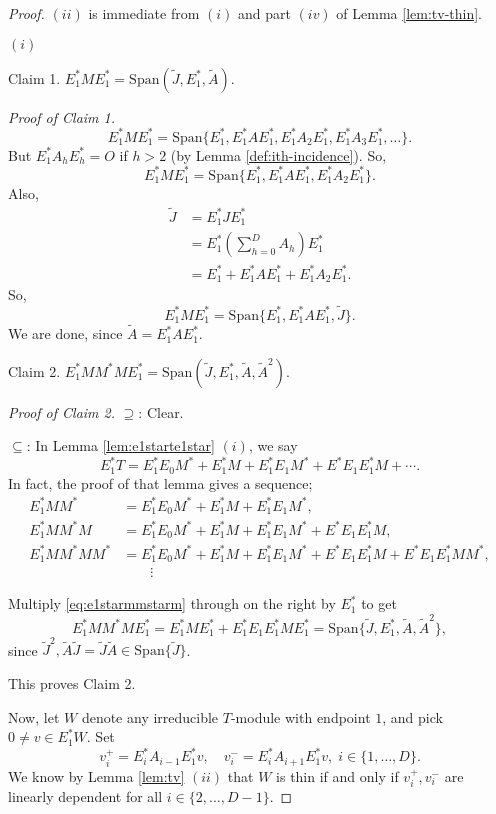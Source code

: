 \documentclass[
]{book}
\theoremstyle{definition}
\theoremstyle{definition}
\theoremstyle{definition}
\theoremstyle{definition}
\theoremstyle{remark}
\begin{document}
\begin{proof}
\leavevmode

\((ii)\) is immediate from \((i)\) and part \((iv)\) of Lemma \ref{lem:tv-thin}.

\((i)\)

Claim 1. \(E^*_1ME^*_1 = \mathrm{Span}(\tilde{J}, E^*_1, \tilde{A})\).

\emph{Proof of Claim 1.}
\[E^*_1ME^*_1 = \mathrm{Span}\{E^*_1, E^*_1AE^*_1, E^*_1A_2E^*_1, E^*_1A_3E^*_1, \ldots\}.\]
But \(E^*_1A_hE^*_h = O\) if \(h >2\) (by Lemma \ref{def:ith-incidence}).
So,
\[E^*_1ME^*_1 = \mathrm{Span}\{E^*_1, E^*_1AE^*_1, E^*_1A_2E^*_1\}.\]
Also,
\begin{align}
\tilde{J} & = E^*_1JE^*_1 \\
& = E^*_1\left(\sum_{h=0}^DA_h\right)E^*_1\\
& = E^*_1 + E^*_1AE^*_1 + E^*_1A_2E^*_1.
\end{align}
So,
\[E^*_1ME^*_1 = \mathrm{Span}\{E^*_1, E^*_1AE^*_1, \tilde{J}\}.\]
We are done, since \(\tilde{A} = E^*_1AE^*_1\).

Claim 2. \(E^*_1MM^*ME^*_1 = \mathrm{Span}(\tilde{J}, E^*_1, \tilde{A}, \tilde{A}^2)\).

\emph{Proof of Claim 2.}
\(\supseteq\): Clear.

\(\subseteq\): In Lemma \ref{lem:e1starte1star} \((i)\), we say
\[E^*_1T = E^*_1E_0M^* + E^*_1M + E^*_1E_1M^* + E^*E_1E^*_1M + \cdots.\]
In fact, the proof of that lemma gives a sequence;
\begin{align}
E^*_1MM^* & = E^*_1E_0M^* + E^*_1M + E^*_1E_1M^*,\\
E^*_1MM^*M & = E^*_1E_0M^* + E^*_1M + E^*_1E_1M^* + E^*E_1E^*_1M, \label{eq:e1starmmstarm}\\
E^*_1MM^*MM^* & = E^*_1E_0M^* + E^*_1M + E^*_1E_1M^* + E^*E_1E^*_1M + E^*E_1E^*_1MM^*,\\
& \qquad \vdots
\end{align}

Multiply \eqref{eq:e1starmmstarm} through on the right by \(E^*_1\) to get
\[E^*_1MM^*ME^*_1 = E^*_1ME^*_1 + E^*_1E_1E^*_1ME^*_1 = \mathrm{Span}\{\tilde{J}, E^*_1, \tilde{A}, \tilde{A}^2\},\]
since \(\tilde{J}^2, \tilde{A}\tilde{J} = \tilde{J}\tilde{A}\in \mathrm{Span}\{\tilde{J}\}\).

This proves Claim 2.

Now, let \(W\) denote any irreducible \(T\)-module with endpoint \(1\), and pick \(0\neq v\in E^*_1W\). Set
\[v^+_i = E^*_iA_{i-1}E^*_1v, \quad v^-_i = E^*_iA_{i+1}E^*_1v, \; i\in \{1, \ldots, D\}.\]
We know by Lemma \ref{lem:tv} \((ii)\) that \(W\) is thin if and only if \(v^+_i, v^-_i\) are linearly dependent for all \(i\in \{2, \ldots, D-1\}\).


\end{proof}
\end{document}
